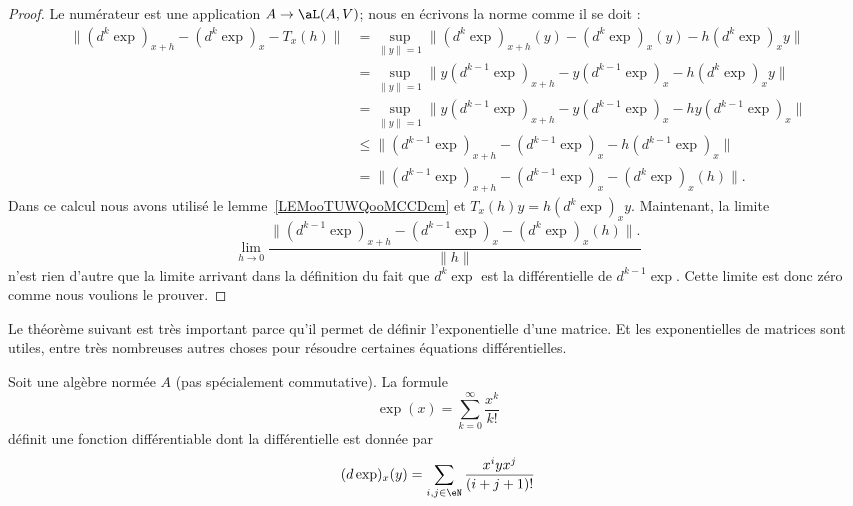 \begin{proof}
	Le numérateur est une application \( A\to \aL(A,V)\); nous en écrivons la norme comme il se doit :
	\begin{subequations}
		\begin{align}
			\|   (d^k\exp)_{x+h}-(d^k\exp)_x-T_x(h) \| & =\sup_{\| y \|=1}\| (d^{k}\exp)_{x+h}(y)-(d^k\exp)_x(y)-h(d^{k}\exp)_xy \|     \\
			                                           & =\sup_{\| y \|=1}\| y(d^{k-1}\exp)_{x+h}-y(d^{k-1}\exp)_x-h(d^k\exp)_xy \|     \\
			                                           & =\sup_{\| y \|=1}\| y(d^{k-1}\exp)_{x+h}-y(d^{k-1}\exp)_x-hy(d^{k-1}\exp)_x \| \\
			                                           & \leq \| (d^{k-1}\exp)_{x+h}-(d^{k-1}\exp)_x-h(d^{k-1}\exp)_x \|                \\
			                                           & =\| (d^{k-1}\exp)_{x+h}-(d^{k-1}\exp)_x-(d^{k}\exp)_x(h) \|.
		\end{align}
	\end{subequations}
	Dans ce calcul nous avons utilisé le lemme~\ref{LEMooTUWQooMCCDcm} et \( T_x(h)y=h(d^{k}\exp)_xy\).
	Maintenant, la limite
	\begin{equation}
		\lim_{h\to 0} \frac{  \| (d^{k-1}\exp)_{x+h}-(d^{k-1}\exp)_x-(d^{k}\exp)_x(h) \|.}{ \| h \| }
	\end{equation}
	n'est rien d'autre que la limite arrivant dans la définition du fait que \( d^k\exp\) est la différentielle de \( d^{k-1}\exp\). Cette limite est donc zéro comme nous voulions le prouver.
\end{proof}


Le théorème suivant est très important parce qu'il permet de définir l'exponentielle d'une matrice. Et les exponentielles de matrices sont utiles, entre très nombreuses autres choses pour résoudre certaines équations différentielles.
\begin{theoremDef}      \label{THOooFGTQooZPiVLO}
	Soit une algèbre normée \( A\) (pas spécialement commutative). La formule
	\begin{equation}
		\exp(x)=\sum_{k=0}^{\infty}\frac{ x^k }{ k! }
	\end{equation}
	définit une fonction différentiable dont la différentielle est donnée par
	\begin{equation}        \label{EQooFGPPooZKHeXU}
		(d\exp)_x(y)=\sum_{i,j\in \eN}\frac{ x^iyx^j }{ (i+j+1)! }
	\end{equation}
\end{theoremDef}

